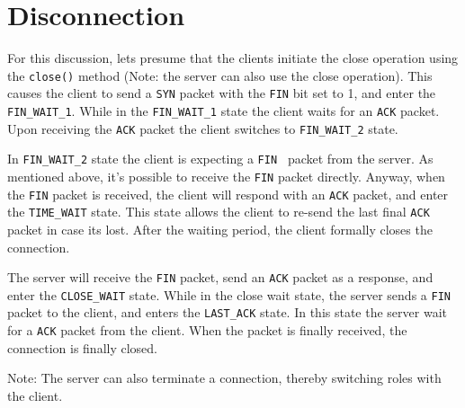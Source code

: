 \documentclass{article}
\begin{document}
\section{Disconnection}

For this discussion, lets presume that the clients initiate the close
operation using the \texttt{close()} method (Note: the server can also use the close
operation). This causes the client to send a \texttt{SYN} packet with the 
\texttt{FIN} bit set to 1, and enter the \texttt{FIN\_WAIT\_1}.
While in the \texttt{FIN\_WAIT\_1} state the client waits for an 
\texttt{ACK} packet. Upon receiving the \texttt{ACK} packet the client
switches to \texttt{FIN\_WAIT\_2} state.

\bigskip

In \texttt{FIN\_WAIT\_2} state the client is expecting a \texttt{FIN%
} packet from the server. As mentioned above, it's possible to receive the 
\texttt{FIN} packet directly. Anyway, when the \texttt{FIN} packet is
received, the client will respond with an \texttt{ACK} packet, and enter the
\texttt{\texttt{TIME\_WAIT}} state. This state allows the client to re-send the last final 
\texttt{ACK} packet in case its lost. After the waiting period, the client
formally closes the connection.

\bigskip

The server will receive the \texttt{FIN} packet, send an \texttt{ACK} packet
as a response, and enter the \texttt{CLOSE\_WAIT} state. While in the close wait
state, the server sends a \texttt{FIN} packet to the client, and enters the 
\texttt{LAST\_ACK} state. In this state the server wait for a \texttt{ACK}
packet from the client. When the packet is finally received, the connection
is finally closed.

\bigskip

Note: The server can also terminate a connection, thereby switching roles
with the client.
\end{document}
